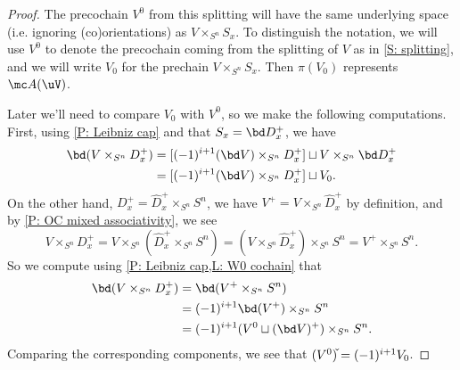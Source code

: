 \begin{example}
\begin{proof}
	The precochain $V^0$ from this splitting will have the same underlying space (i.e. ignoring (co)orientations) as $V \times_{S^n} S_x$.
	To distinguish the notation, we will use $V^0$ to denote the precochain coming from the splitting of $V$ as in \cref{S: splitting}, and we will write $V_0$ for the prechain $V \times_{S^n} S_x$.
	Then $\pi(V_0)$ represents $\mc A(\uV)$.

	Later we'll need to compare $V_0$ with $V^0$, so we make the following computations.
	First, using \cref{P: Leibniz cap} and that $S_x = \bd D_x^+$, we have
	\begin{align*}
	\bd(V \times_{S^n} D^+_x) &= [(-1)^{i+1} (\bd V)\times_{S^n} D^+_x] \sqcup V \times_{S^n} \bd D^+_x\\
	&=[(-1)^{i+1} (\bd V)\times_{S^n} D^+_x] \sqcup V_0.
	\end{align*}
	On the other hand, $D^+_x = \hat D^+_x \times_{S^n} S^n$, we have $V^+ = V \times_{S^n} \hat D^+_x$ by definition, and by \cref{P: OC mixed associativity}, we see $$V \times_{S^n} D^+_x = V \times_{S^n}(\hat D^+_x \times_{S^n} S^n) = (V \times_{S^n} \hat D^+_x ) \times_{S^n} S^n = V^+  \times_{S^n} S^n.$$
	So we compute using \cref{P: Leibniz cap,L: W0 cochain} that
	\begin{align*}
	\bd(V \times_{S^n} D^+_x) &= \bd(V^+  \times_{S^n} S^n )\\
	 &= (-1)^{i+1}\bd (V^+) \times_{S^n} S^n\\
	 &= (-1)^{i+1} (V^0 \sqcup (\bd V)^+) \times_{S^n} S^n.
	\end{align*}
	Comparing the corresponding components, we see that $(V^0)\check{\vrule height1.3ex width0pt} = (-1)^{i+1}V_0$.


	\begin{comment}
	Let us determine the relationship between $V_0$ and $(V^0)\,\check{\vrule height1.3ex width0pt}$ COME BACK IF WE NEED THIS
	\end{comment}


\end{proof}
\end{example}
